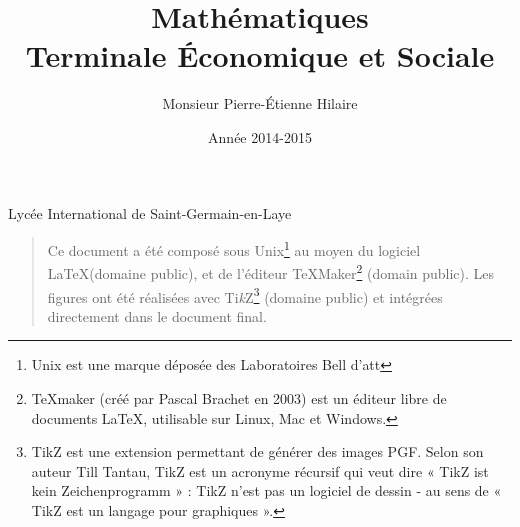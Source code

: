 
\usepackage[T1]{fontenc} 
\usepackage[a4paper,left=2cm,right=2cm,top=2cm,bottom=2cm]{geometry} 
\usepackage{lmodern} 
\usepackage{graphicx} 
\usepackage{fancyhdr}

\usepackage[french]{babel}

\usepackage{textcomp}
\usepackage{texgraph}
\usepackage{pgf,tikz}
\usetikzlibrary{arrows}

\usepackage{variations}

\ifdefined\COMPLETE
\else
    \newcommand{\COMPLETE}
\fi                        %


\title {  \Huge     Mathématiques\\
             Terminale Économique et Sociale \\
       }

\author{ \Large   Monsieur Pierre-Étienne Hilaire  }

\date  { \large  Année 2014-2015   }





\maketitle\thispagestyle{empty} %
\vfill

\centerline {\large  Lycée International de Saint-Germain-en-Laye} 

\newpage

\thispagestyle{empty}

\def\TikZ{{\fontfamily{cmr}Ti{\em k}Z}} 
    \begin {quote}
    Ce document a été composé sous  Unix\footnote{Unix  est une
    marque déposée des  Laboratoires  Bell d'{\sc att}} au moyen  
    du logiciel \LaTeX (domaine  public),
    et de l'éditeur {\TeX}{Maker}\footnote{TeXmaker (créé par Pascal Brachet en 2003) est un éditeur libre de documents LaTeX, utilisable sur Linux, Mac et Windows.} (domain public). 
    Les figures ont été réalisées avec {\TikZ}\footnote{TikZ est une extension permettant de générer des images PGF. Selon son auteur Till Tantau, TikZ est un acronyme récursif qui veut dire « TikZ ist kein Zeichenprogramm » : TikZ n'est pas un logiciel de dessin - au sens de « TikZ est un langage pour graphiques ».} (domaine
   public)  et  intégrées  directement  dans le  document  final.
    \end {quote}

